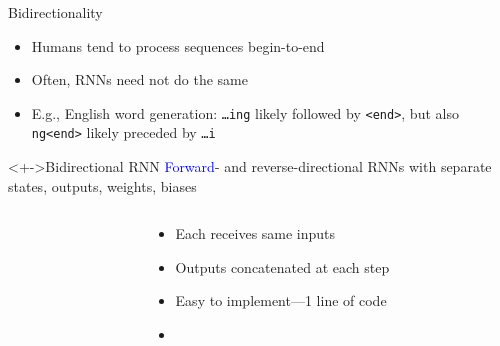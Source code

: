 \begin{frame}{Bidirectionality}
    \begin{itemize}[<.->]
        \item<+-> Humans tend to process sequences begin-to-end
        \item Often, RNNs need not do the same
        \item E.g., English word generation: \texttt{\ldots{}ing} likely followed by \texttt{<end>}, but also \texttt{ng<end>} likely preceded by \texttt{\ldots{}i}
    \end{itemize}

    \begin{block}<+->{Bidirectional RNN}
        \textcolor{blue}{Forward}- and \textcolor{Green4}{reverse}-directional RNNs with separate states, outputs, weights, biases
    \end{block}

    \begin{columns}
        \begin{column}{0.6\textwidth}
            
        \end{column}
        \begin{column}{0.4\textwidth}
            \begin{itemize}[<.->]
                \item Each receives same inputs
                \item Outputs concatenated at each step
                \item Easy to implement---1 line of code
                \item \citet{SchusterIEEESP97}
            \end{itemize}
        \end{column}
    \end{columns}
\end{frame}

